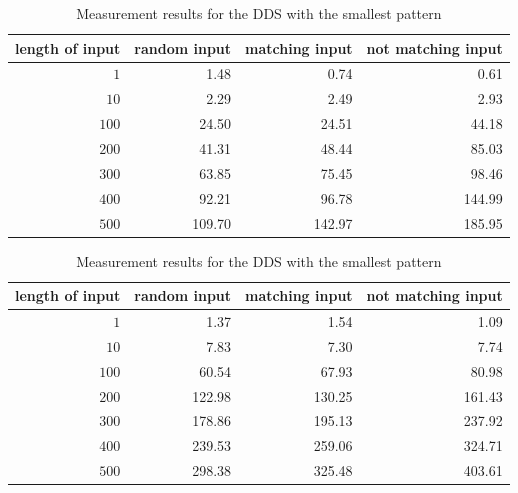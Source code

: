 		\begin{table}
			\centering
			\caption{Measurement results for the DDS with the smallest pattern}		
			\label{tab:cep:measrun:small:dds}
			\begin{tabular}{rrrr}
				\toprule
				length of input & random input & matching input & not matching input \\ \midrule
				            $1$ &         1.48 &           0.74 &               0.61 \\
				           $10$ &         2.29 &           2.49 &               2.93 \\
				          $100$ &        24.50 &          24.51 &              44.18 \\
				          $200$ &        41.31 &          48.44 &              85.03 \\
				          $300$ &        63.85 &          75.45 &              98.46 \\
				          $400$ &        92.21 &          96.78 &             144.99 \\
				          $500$ &       109.70 &         142.97 &             185.95 \\ \bottomrule
			\end{tabular}
		\end{table}
	
		\begin{table}
			\centering
			\caption{Measurement results for the DDS with the smallest pattern}		
			\label{tab:cep:measrun:big:dds}
			\begin{tabular}{rrrr}
				\toprule
				length of input & random input & matching input & not matching input \\ \midrule
				            $1$ &         1.37 &           1.54 &               1.09 \\
				           $10$ &         7.83 &           7.30 &               7.74 \\
				          $100$ &        60.54 &          67.93 &              80.98 \\
				          $200$ &       122.98 &         130.25 &             161.43 \\
				          $300$ &       178.86 &         195.13 &             237.92 \\
				          $400$ &       239.53 &         259.06 &             324.71 \\
				          $500$ &       298.38 &         325.48 &             403.61 \\ \bottomrule
			\end{tabular}
		\end{table}
